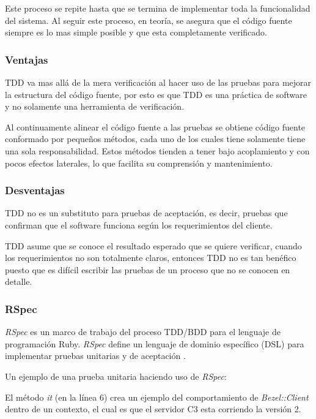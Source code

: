 Este proceso se repite hasta que se termina de implementar toda la funcionalidad
del sistema. Al seguir este proceso, en teoría, se asegura que el código fuente
siempre es lo mas simple posible y que esta completamente verificado.

\subsubsection{Ventajas}
TDD va mas allá de la mera verificación al hacer uso de las pruebas para
mejorar la estructura del código fuente, por esto es que TDD es una práctica
de software y no solamente una herramienta de verificación.

Al continuamente alinear el código fuente a las pruebas se obtiene código fuente
conformado por pequeños métodos, cada uno de los cuales tiene solamente tiene
una sola responsabilidad. Estos métodos tienden a tener bajo acoplamiento y
con pocos efectos laterales, lo que facilita su comprensión y mantenimiento.

\subsubsection{Desventajas}
TDD no es un substituto para pruebas de aceptación, es decir, pruebas que confirman
que el software funciona según los requerimientos del cliente.

TDD asume que se conoce el resultado esperado que se quiere verificar,
cuando los requerimientos no son totalmente claros, entonces TDD no es tan benéfico
puesto que es difícil escribir las pruebas de un proceso que no se conocen en detalle.

\subsubsection{RSpec}
\textit{RSpec} es un marco de trabajo del proceso TDD/BDD para el lenguaje de
programación Ruby. \textit{RSpec} define un lenguaje de dominio específico (DSL)
para implementar pruebas unitarias y de aceptación \cite{23_chelimsky_2010}.

\vspace{2.5mm}

Un ejemplo de una prueba unitaria haciendo uso de \textit{RSpec}:


El método \textit{it} (en la línea 6) crea un ejemplo del comportamiento de
\textit{Bezel::Client} dentro de un contexto, el cual es que el servidor C3
esta corriendo la versión 2.

